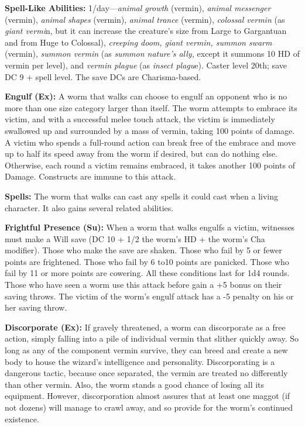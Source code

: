 \documentclass{article}
\begin{document}
{\textbf{Spell-Like Abilities: }1/day---\textit{animal growth }(vermin), \textit{animal 
messenger }(vermin), \textit{animal shapes }(vermin), \textit{animal trance }(vermin), 
\textit{colossal vermin }(as \textit{giant vermi}n, but it can increase the creature's 
size from Large to Gargantuan and from Huge to Colossal), \textit{creeping doom, 
giant vermin, summon swarm }(vermin), \textit{summon vermin }(as \textit{summon 
nature's ally, }except it summons 10 HD of vermin per level), and \textit{vermin 
plague }(as \textit{insect plagu}e). Caster level 20th; save DC 9 + spell level. 
The save DCs are Charisma-based.

\textbf{Engulf (Ex):} A worm that walks can choose to engulf an opponent who is 
no more than one size category larger than itself. The worm attempts to embrace 
its victim, and with a successful melee touch attack, the victim is immediately 
swallowed up and surrounded by a mass of vermin, taking 100 points of damage. A 
victim who spends a full-round action can break free of the embrace and move up 
to half its speed away from the worm if desired, but can do nothing else. Otherwise, 
each round a victim remains embraced, it takes another 100 points of Damage. Constructs 
are immune to this attack. 

\textbf{Spells:} The worm that walks can cast any spells it could cast when a living 
character. It also gains several related abilities.

\textbf{Frightful Presence (Su):} When a worm that walks engulfs a victim, witnesses 
must make a Will save (DC 10 + 1/2 the worm's HD + the worm's Cha modifier). Those 
who make the save are shaken. Those who fail by 5 or fewer points are frightened. 
Those who fail by 6 to10 points are panicked. Those who fail by 11 or more points 
are cowering. All these conditions last for 1d4 rounds. Those who have seen a worm 
use this attack before gain a +5 bonus on their saving throws. The victim of the 
worm's engulf attack has a -5 penalty on his or her saving throw. 

\textbf{Discorporate (Ex):} If gravely threatened, a worm can discorporate as a 
free action, simply falling into a pile of individual vermin that slither quickly 
away. So long as any of the component vermin survive, they can breed and create 
a new body to house the wizard's intelligence and personality. Discorporating is 
a dangerous tactic, because once separated, the vermin are treated no differently 
than other vermin. Also, the worm stands a good chance of losing all its equipment. 
However, discorporation almost assures that at least one maggot (if not dozens) 
will manage to crawl away, and so provide for the worm's continued existence. 

}
\end{document}
